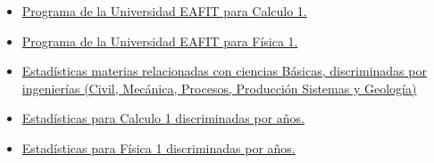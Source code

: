 \documentclass[twoside,letterpaper,11pt]{report}
\begin{document}
\begin{itemize}

	\item 	\href{https://github.com/smonsalve/OA/blob/master/Apendices/1%20CB0240pdf.pdf?raw=true}
	{Programa de la Universidad EAFIT para Calculo 1.}

	\item 	\href{https://github.com/smonsalve/OA/blob/master/Apendices/1%20CB0236pdf.pdf?raw=true}
	{Programa de la Universidad EAFIT para Física 1.}

	\item \href{https://github.com/smonsalve/OA/blob/master/Apendices/EstadisticasDepuradas.xlsx?raw=true}
	{Estadísticas materias relacionadas con ciencias Básicas, discriminadas por ingenierías (Civil, Mecánica, Procesos, Producción Sistemas y Geología)}

	\item \href{https://github.com/smonsalve/OA/blob/master/Apendices/Calculo1.xlsx?raw=true}
	{Estadísticas para Calculo 1 discriminadas por años.}

	\item \href{https://github.com/smonsalve/OA/blob/master/Apendices/Fisica1.xlsx?raw=true}
	{Estadísticas para Física 1 discriminadas por años.}

\end{itemize}
\end{document}
